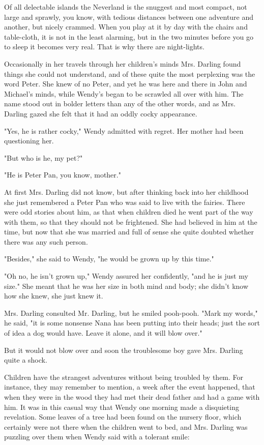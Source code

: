 Of all delectable islands the Neverland is the snuggest and most compact,
not large and sprawly, you know, with tedious distances between one
adventure and another, but nicely crammed. When you play at it by day with
the chairs and table-cloth, it is not in the least alarming, but in the
two minutes before you go to sleep it becomes very real. That is why there
are night-lights.


Occasionally in her travels through her children's minds Mrs. Darling
found things she could not understand, and of these quite the most
perplexing was the word Peter. She knew of no Peter, and yet he was here
and there in John and Michael's minds, while Wendy's began to be scrawled
all over with him. The name stood out in bolder letters than any of the
other words, and as Mrs. Darling gazed she felt that it had an oddly cocky
appearance.


"Yes, he is rather cocky," Wendy admitted with regret. Her mother had been
questioning her.


"But who is he, my pet?"


"He is Peter Pan, you know, mother."


At first Mrs. Darling did not know, but after thinking back into her
childhood she just remembered a Peter Pan who was said to live with the
fairies. There were odd stories about him, as that when children died he
went part of the way with them, so that they should not be frightened. She
had believed in him at the time, but now that she was married and full of
sense she quite doubted whether there was any such person.


"Besides," she said to Wendy, "he would be grown up by this time."


"Oh no, he isn't grown up," Wendy assured her confidently, "and he is just
my size." She meant that he was her size in both mind and body; she didn't
know how she knew, she just knew it.


Mrs. Darling consulted Mr. Darling, but he smiled pooh-pooh. "Mark my
words," he said, "it is some nonsense Nana has been putting into their
heads; just the sort of idea a dog would have. Leave it alone, and it will
blow over."


But it would not blow over and soon the troublesome boy gave Mrs. Darling
quite a shock.


Children have the strangest adventures without being troubled by them. For
instance, they may remember to mention, a week after the event happened,
that when they were in the wood they had met their dead father and had a
game with him. It was in this casual way that Wendy one morning made a
disquieting revelation. Some leaves of a tree had been found on the
nursery floor, which certainly were not there when the children went to
bed, and Mrs. Darling was puzzling over them when Wendy said with a
tolerant smile:


